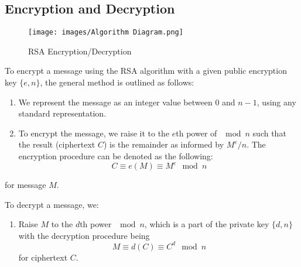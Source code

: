 \documentclass{article}
\begin{document}
\subsection{Encryption and Decryption}
\begin{figure}[H]
    \centering
    \texttt{[image: images/Algorithm Diagram.png]}
    \caption{RSA Encryption/Decryption}
\end{figure}
To encrypt a message using the RSA algorithm with a given public encryption key $\{e, n\}$, the general method is outlined as follows:
\begin{enumerate}
    \item We represent the message as an integer value between $0$ and $n-1$, using any standard representation. 
    \item To encrypt the message, we raise it to the $e$th power of $\mod n$ such that the result (ciphertext $C$) is the remainder as informed by $M^e / n$. The encryption procedure can be denoted as the following:
\begin{equation}
C \equiv e(M) \equiv M^e \mod n
\end{equation}
\end{enumerate}
for message $M$.

To decrypt a message, we:
\begin{enumerate}
    \item Raise $M$ to the $d$th power $\mod n$, which is a part of the private key $\{d, n\}$ with the decryption procedure being 
\begin{equation}
M \equiv d(C) \equiv C^d \mod n
\end{equation}
for ciphertext $C$.
\end{enumerate}
\end{document}
